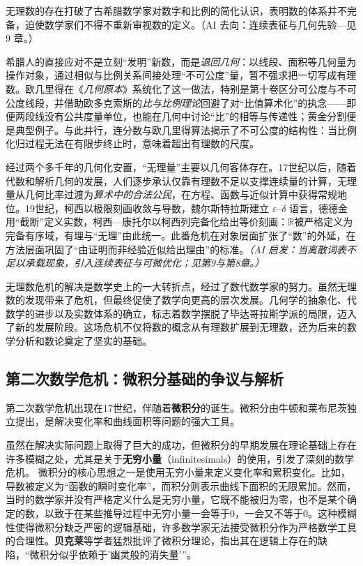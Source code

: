 无理数的存在打破了古希腊数学家对数字和比例的简化认识，表明数的体系并不完备，迫使数学家们不得不重新审视数的定义。{（AI 去向：连续表征与几何先验—见 9 章。）}

希腊人的直接应对不是立刻“发明”新数，而是{\itshape 退回几何}：以线段、面积等几何量为操作对象，通过相似与比例关系间接处理“不可公度”量，暂不强求把一切写成有理数。欧几里得在《\emph{几何原本}》系统化了这一做法，特别是第十卷区分可公度与不可公度线段，并借助欧多克索斯的{\itshape 比与比例理论}回避了对“比值算术化”的执念——即便两段线没有公共度量单位，也能在几何中讨论“比”的相等与传递性；黄金分割便是典型例子。与此并行，连分数与欧几里得算法揭示了不可公度的结构性：当比例化归过程无法在有限步终止时，意味着超出有理数的尺度。

经过两个多千年的几何化安置，“无理量”主要以几何客体存在。17世纪以后，随着代数和解析几何的发展，人们逐步承认仅靠有理数不足以支撑连续量的计算，无理量从几何比率过渡为{\itshape 算术中的合法公民}，在方程、函数与近似计算中获得常规地位。19世纪，柯西以极限刻画收敛与导数，魏尔斯特拉斯建立 $\varepsilon$–$\delta$ 语言，德德金用“截断”定义实数，柯西—康托尔以柯西列完备化给出等价刻画：$\mathbb{R}$被严格定义为完备有序域，有理与“无理”由此统一。此番危机在对象层面扩张了“数”的外延，在方法层面巩固了“由证明而非经验近似给出理由”的标准。{\itshape（AI 启发：当离散词表不足以承载现象，引入连续表征与可微优化；见第9与第8章。）}

无理数危机的解决是数学史上的一大转折点，经过了数代数学家的努力。虽然无理数的发现带来了危机，但最终促使了数学向更高的层次发展。几何学的抽象化、代数学的进步以及实数体系的确立，标志着数学摆脱了毕达哥拉斯学派的局限，迈入了新的发展阶段。这场危机不仅将数的概念从有理数扩展到无理数，还为后来的数学分析和数论奠定了坚实的基础。

\subsection{第二次数学危机：微积分基础的争议与解析}
第二次数学危机出现在17世纪，伴随着{\bf 微积分}的诞生。微积分由牛顿和莱布尼茨独立提出，是解决变化率和曲线面积等问题的强大工具。

虽然在解决实际问题上取得了巨大的成功，但微积分的早期发展在理论基础上存在许多模糊之处，尤其是关于{\bf 无穷小量}（infinitesimals）的使用，引发了深刻的数学危机。
微积分的核心思想之一是使用无穷小量来定义变化率和累积变化。比如，导数被定义为“函数的瞬时变化率”，而积分则表示曲线下面积的无限累加。然而，当时的数学家并没有严格定义什么是无穷小量，它既不能被归为零，也不是某个确定的数，以致于在某些推导过程中无穷小量一会等于0，一会又不等于0。这种模糊性使得微积分缺乏严密的逻辑基础，许多数学家无法接受微积分作为严格数学工具的合理性。{\bf 贝克莱}等学者猛烈批评了微积分理论，指出其在逻辑上存在的缺陷，“微积分似乎依赖于'幽灵般的消失量'”。

